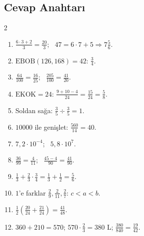 \subsection*{Cevap Anahtarı}
{\small
\begin{multicols}{2}
\begin{enumerate}[label=\textbf{\arabic*.},leftmargin=*,itemsep=1pt]
\item \(\frac{6\cdot 3+2}{3}=\frac{20}{3}\); \ \(47=6\cdot 7+5\Rightarrow 7\frac{5}{6}\).
\item \(\text{EBOB}(126,168)=42\): \(\frac{3}{4}\).
\item \(\frac{64}{100}=\frac{16}{25}\); \ \(\frac{205}{100}=\frac{41}{20}\).
\item \(\text{EKOK}=24\): \(\frac{9+10-4}{24}=\frac{15}{24}=\frac{5}{8}\).
\item Soldan sağa: \(\frac{3}{5}\div\frac{3}{5}=1\).
\item \(10000\) ile genişlet: \(\frac{560}{14}=40\).
\item \(7{,}2\cdot 10^{-4}\); \ \(5{,}8\cdot 10^{7}\).
\item \(\frac{36}{99}=\frac{4}{11}\); \ \(\frac{45-4}{90}=\frac{41}{90}\).
\item \(\frac{1}{3}+\frac{2}{3}\cdot\frac{3}{4}=\frac{1}{3}+\frac{1}{2}=\frac{5}{6}\).
\item \(1\)'e farklar \(\frac{2}{9},\frac{2}{11},\frac{2}{7}\): \(c<a<b\).
\item \(\frac{1}{2}\left(\frac{20}{24}+\frac{21}{24}\right)=\frac{41}{48}\).
\item \(360+210=570\); \(570\cdot\frac{2}{3}=380\) L; \(\frac{380}{840}=\frac{19}{42}\).
\end{enumerate}
\end{multicols}}
